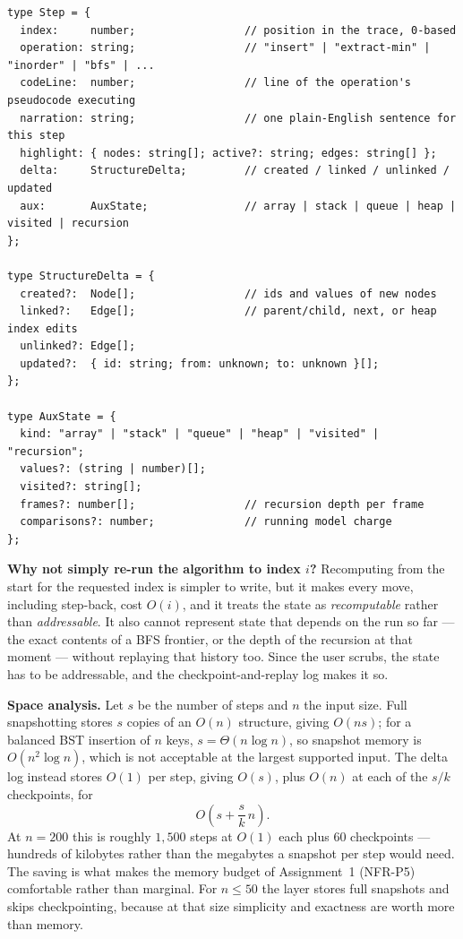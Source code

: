 \documentclass[11pt,a4paper]{article}
\newcommand{\ct}[1]{\texttt{#1}}
\begin{document}
\begin{lstlisting}[style=ts,caption={The three payloads of a step. \ct{highlight} is the pointer at
this moment; \ct{aux} is the accumulated ledger; \ct{delta} is the structural edit. All three are
serialisable, which is what lets the same trace cross a Web Worker, be stored as a fixture, and be
asserted in a test.},label={lst:step}]
type Step = {
  index:     number;                 // position in the trace, 0-based
  operation: string;                 // "insert" | "extract-min" | "inorder" | "bfs" | ...
  codeLine:  number;                 // line of the operation's pseudocode executing
  narration: string;                 // one plain-English sentence for this step
  highlight: { nodes: string[]; active?: string; edges: string[] };
  delta:     StructureDelta;         // created / linked / unlinked / updated
  aux:       AuxState;               // array | stack | queue | heap | visited | recursion
};

type StructureDelta = {
  created?:  Node[];                 // ids and values of new nodes
  linked?:   Edge[];                 // parent/child, next, or heap index edits
  unlinked?: Edge[];
  updated?:  { id: string; from: unknown; to: unknown }[];
};

type AuxState = {
  kind: "array" | "stack" | "queue" | "heap" | "visited" | "recursion";
  values?: (string | number)[];
  visited?: string[];
  frames?: number[];                 // recursion depth per frame
  comparisons?: number;              // running model charge
};
\end{lstlisting}

\smallskip
\noindent\textbf{Why not simply re-run the algorithm to index $i$?} Recomputing from the start for
the requested index is simpler to write, but it makes every move, including step-back, cost $O(i)$,
and it treats the state as \emph{recomputable} rather than \emph{addressable}. It also cannot
represent state that depends on the run so far --- the exact contents of a BFS frontier, or the
depth of the recursion at that moment --- without replaying that history too. Since the user
scrubs, the state has to be addressable, and the checkpoint-and-replay log makes it so.

\smallskip
\noindent\textbf{Space analysis.} Let $s$ be the number of steps and $n$ the input size. Full
snapshotting stores $s$ copies of an $O(n)$ structure, giving $O(ns)$; for a balanced BST insertion
of $n$ keys, $s=\Theta(n\log n)$, so snapshot memory is $O(n^2\log n)$, which is not acceptable at
the largest supported input. The delta log instead stores $O(1)$ per step, giving $O(s)$, plus
$O(n)$ at each of the $s/k$ checkpoints, for
\[
O\!\left(s + \frac{s}{k}\,n\right).
\]
At $n=200$ this is roughly $1{,}500$ steps at $O(1)$ each plus $60$ checkpoints --- hundreds of
kilobytes rather than the megabytes a snapshot per step would need. The saving is what makes the
memory budget of Assignment~1 (NFR-P5) comfortable rather than marginal. For $n\le 50$ the layer
stores full snapshots and skips checkpointing, because at that size simplicity and exactness are
worth more than memory.
\end{document}
